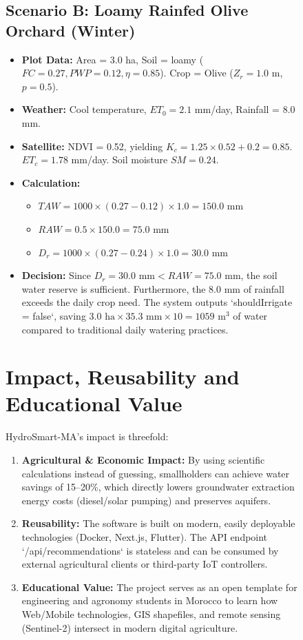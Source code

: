 \documentclass[3p,twocolumn]{elsarticle}
\begin{document}
\begin{figure}[t]
\subsection{Scenario B: Loamy Rainfed Olive Orchard (Winter)}
\begin{itemize}
    \item \textbf{Plot Data:} Area = 3.0 ha, Soil = loamy ($FC = 0.27, PWP = 0.12, \eta = 0.85$). Crop = Olive ($Z_r = 1.0$ m, $p = 0.5$).
    \item \textbf{Weather:} Cool temperature, $ET_0 = 2.1$ mm/day, Rainfall = 8.0 mm.
    \item \textbf{Satellite:} NDVI = 0.52, yielding $K_c = 1.25 \times 0.52 + 0.2 = 0.85$. $ET_c = 1.78$ mm/day. Soil moisture $SM = 0.24$.
    \item \textbf{Calculation:}
        \begin{itemize}
            \item $TAW = 1000 \times (0.27 - 0.12) \times 1.0 = 150.0$ mm
            \item $RAW = 0.5 \times 150.0 = 75.0$ mm
            \item $D_r = 1000 \times (0.27 - 0.24) \times 1.0 = 30.0$ mm
        \end{itemize}
    \item \textbf{Decision:} Since $D_r = 30.0\text{ mm} < RAW = 75.0\text{ mm}$, the soil water reserve is sufficient. Furthermore, the 8.0 mm of rainfall exceeds the daily crop need. The system outputs `shouldIrrigate = false`, saving $3.0\text{ ha} \times 35.3\text{ mm} \times 10 = 1059 \text{ m}^3$ of water compared to traditional daily watering practices.
\end{itemize}

\section{Impact, Reusability and Educational Value}
HydroSmart-MA's impact is threefold:
\begin{enumerate}
    \item \textbf{Agricultural & Economic Impact:} By using scientific calculations instead of guessing, smallholders can achieve water savings of 15--20\%, which directly lowers groundwater extraction energy costs (diesel/solar pumping) and preserves aquifers.
    \item \textbf{Reusability:} The software is built on modern, easily deployable technologies (Docker, Next.js, Flutter). The API endpoint `/api/recommendations` is stateless and can be consumed by external agricultural clients or third-party IoT controllers.
    \item \textbf{Educational Value:} The project serves as an open template for engineering and agronomy students in Morocco to learn how Web/Mobile technologies, GIS shapefiles, and remote sensing (Sentinel-2) intersect in modern digital agriculture.
\end{enumerate}


\end{figure}
\end{document}
